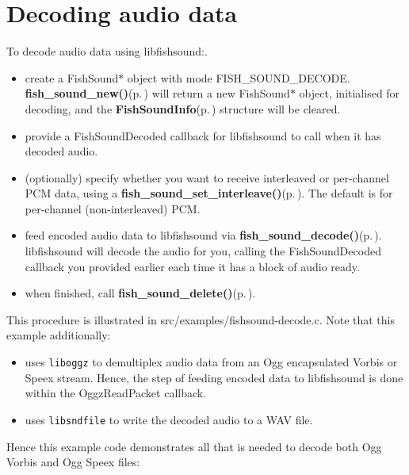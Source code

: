 \section{Decoding audio data}
\label{group__decode}
To decode audio data using libfishsound:.  
\begin{itemize}
\item create a Fish\-Sound$\ast$ object with mode FISH\_\-SOUND\_\-DECODE. {\bf fish\_\-sound\_\-new()}{\rm (p.\,\pageref{fishsound_8h_a4})} will return a new Fish\-Sound$\ast$ object, initialised for decoding, and the {\bf Fish\-Sound\-Info}{\rm (p.\,\pageref{structFishSoundInfo})} structure will be cleared.\item provide a Fish\-Sound\-Decoded callback for libfishsound to call when it has decoded audio.\item (optionally) specify whether you want to receive interleaved or per-channel PCM data, using a {\bf fish\_\-sound\_\-set\_\-interleave()}{\rm (p.\,\pageref{fishsound_8h_a14})}. The default is for per-channel (non-interleaved) PCM.\item feed encoded audio data to libfishsound via {\bf fish\_\-sound\_\-decode()}{\rm (p.\,\pageref{fishsound_8h_a7})}. libfishsound will decode the audio for you, calling the Fish\-Sound\-Decoded callback you provided earlier each time it has a block of audio ready.\item when finished, call {\bf fish\_\-sound\_\-delete()}{\rm (p.\,\pageref{fishsound_8h_a11})}.\end{itemize}


This procedure is illustrated in src/examples/fishsound-decode.c. Note that this example additionally:\begin{itemize}
\item uses {\tt liboggz} to demultiplex audio data from an Ogg encapsulated Vorbis or Speex stream. Hence, the step of feeding encoded data to libfishsound is done within the Oggz\-Read\-Packet callback.\item uses {\tt libsndfile} to write the decoded audio to a WAV file.\end{itemize}


Hence this example code demonstrates all that is needed to decode both Ogg Vorbis and Ogg Speex files:



